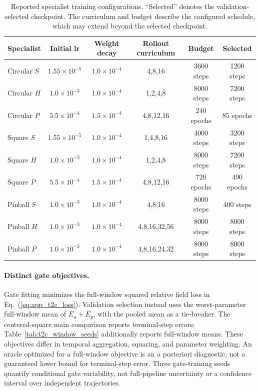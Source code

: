 \documentclass{article}
\def\plaineqref#1{\ref{#1}}
\begin{document}
\par
\begin{table}[H]
\centering
\caption{
Reported specialist training configurations. ``Selected'' denotes the validation-selected checkpoint. The curriculum and budget describe the configured schedule, which may extend beyond the selected checkpoint.
}
\label{tab:specialist_training}
\small
\setlength{\tabcolsep}{3.5pt}
\begin{tabular}{@{}lccccc@{}}
\toprule
Specialist & Initial lr & Weight decay & Rollout curriculum & Budget & Selected \\
\midrule
Circular $S$
& $1.55{\times}10^{-5}$ & $1.0{\times}10^{-4}$
& 4,8,16 & 3600 steps & 1200 steps \\
Circular $H$
& $1.0{\times}10^{-3}$ & $1.0{\times}10^{-4}$
& 1,2,4,8 & 8000 steps & 7200 steps \\
Circular $P$
& $5.5{\times}10^{-4}$ & $1.5{\times}10^{-4}$
& 4,8,12,16 & 240 epochs & 85 epochs \\
\addlinespace
Square $S$
& $1.55{\times}10^{-5}$ & $1.0{\times}10^{-4}$
& 1,4,8,16 & 4000 steps & 3200 steps \\
Square $H$
& $1.0{\times}10^{-3}$ & $1.0{\times}10^{-4}$
& 1,2,4,8 & 8000 steps & 7200 steps \\
Square $P$
& $5.5{\times}10^{-4}$ & $1.5{\times}10^{-4}$
& 4,8,12,16 & 720 epochs & 490 epochs \\
\addlinespace
Pinball $S$
& $1.0{\times}10^{-3}$ & $1.0{\times}10^{-4}$
& 4,8,16 & 8000 steps & 400 steps \\
Pinball $H$
& $1.0{\times}10^{-3}$ & $1.0{\times}10^{-4}$
& 4,8,16,32,56 & 8000 steps & 8000 steps \\
Pinball $P$
& $1.0{\times}10^{-3}$ & $1.0{\times}10^{-4}$
& 4,8,16,24,32 & 8000 steps & 8000 steps \\
\bottomrule
\end{tabular}
\end{table}
\par

\paragraph{Distinct gate objectives.}
Gate fitting minimizes the full-window squared relative field loss in Eq.~(\plaineqref{eq:app_t2c_loss}). Validation selection instead uses the worst-parameter full-window mean of $E_u+E_p$, with the pooled mean as a tie-breaker. The centered-square main comparison reports terminal-step errors; Table~\ref{tab:t2c_window_seeds} additionally reports full-window means. These objectives differ in temporal aggregation, squaring, and parameter weighting. An oracle optimized for a full-window objective is an a posteriori diagnostic, not a guaranteed lower bound for terminal-step error. Three gate-training seeds quantify conditional gate variability, not full-pipeline uncertainty or a confidence interval over independent trajectories.
\end{document}

